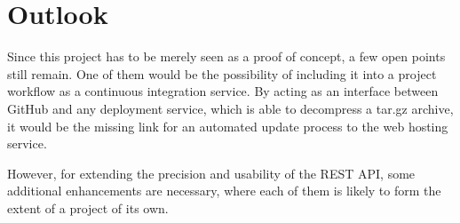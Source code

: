 \chapter{Outlook}
\label{cha:outlook}

Since this project has to be merely seen as a proof of concept, a few open points still remain. One of them would be the possibility of including it into a project workflow as a continuous integration service. By acting as an interface between GitHub and any deployment service, which is able to decompress a tar.gz archive, it would be the missing link for an automated update process to the web hosting service.

However, for extending the precision and usability of the REST API, some additional enhancements are necessary, where each of them is likely to form the extent of a project of its own.



